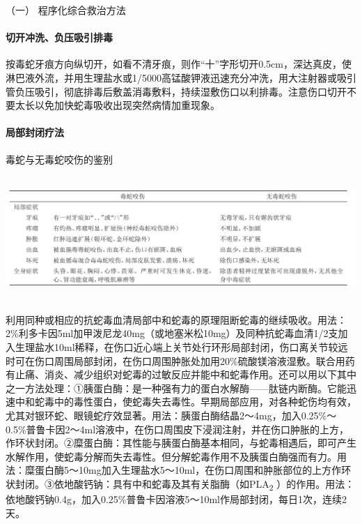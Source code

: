 \hypertarget{text00172.htmlux5cux23CHP5-8-1-3-3-1}{}
（一） 程序化综合救治方法

\paragraph{切开冲洗、负压吸引排毒}

按毒蛇牙痕方向纵切开，如看不清牙痕，则作“十”字形切开0.5cm，深达真皮，使淋巴液外流，并用生理盐水或1/5000高锰酸钾液迅速充分冲洗，用大注射器或吸引管负压吸引，彻底排毒后敷盖消毒敷料，持续湿敷伤口以利排毒。注意伤口切开不要太长以免加快蛇毒吸收出现突然病情加重现象。

\paragraph{局部封闭疗法}

\begin{table}[htbp]
\centering
\caption{毒蛇与无毒蛇咬伤的鉴别}
\label{tab60-4}
\includegraphics[width=6.69792in,height=1.85417in]{./images/Image00231.jpg}
\end{table}

利用同种或相应的抗蛇毒血清局部中和蛇毒的原理阻断蛇毒的继续吸收。用法：2\%利多卡因5ml加甲泼尼龙40mg（或地塞米松10mg）及同种抗蛇毒血清1/2支加入生理盐水10ml稀释，在伤口近心端上关节处行环形局部封闭，伤口离关节较远时可在伤口周围局部封闭，在伤口周围肿胀处加用20\%硫酸镁溶液湿敷。联合用药有止痛、消炎、减少组织对蛇毒的过敏反应并能中和蛇毒作用。还可以用以下其中之一方法处理：①胰蛋白酶：是一种强有力的蛋白水解酶------肽链内断酶。它能迅速中和蛇毒中的毒性蛋白，使蛇毒失去毒性。早期局部应用，对各种蛇伤均有效，尤其对银环蛇、眼镜蛇疗效显著。用法：胰蛋白酶结晶2～4mg，加入0.25\%～0.5\%普鲁卡因2～4ml溶液中，在伤口周围皮下浸润注射，并在伤口肿胀的上方，作环状封闭。②糜蛋白酶：其性能与胰蛋白酶基本相同，与蛇毒相遇后，即可产生水解作用，使蛇毒分解而失去毒性。但分解蛇毒作用不及胰蛋白酶强而有力。用法：糜蛋白酶5～10mg加入生理盐水5～10ml，在伤口周围和肿胀部位的上方作环状封闭。③依地酸钙钠：具有中和蛇毒及其有关脂酶（如PLA\textsubscript{2}
）的作用。用法：依地酸钙钠0.4g，加入0.25\%普鲁卡因溶液5～10ml作局部封闭，每日1次，连续2天。

